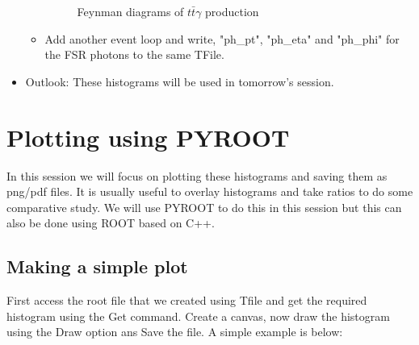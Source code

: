 \documentclass[letterpaper,12pt]{article}
\begin{document}
\begin{itemize}
\begin{itemize}
\begin{figure}[h]
  \centering
  \caption{Feynman diagrams of $t\bar{t}\gamma$ production}
  \label{fig:tty}
\end{figure}

\item Add another event loop and write, "ph\_pt", "ph\_eta" and "ph\_phi" for the FSR photons to the same TFile.   
\end{itemize}
\item Outlook: These histograms will be used in tomorrow's session.
\end{itemize}
\break
\section{Plotting using PYROOT}

In this session we will focus on plotting these histograms and saving them as png/pdf files. It is usually useful to overlay histograms and take ratios to do some comparative study. We will use PYROOT to do this in this session but this can also be done using ROOT based on C++. 

\subsection{Making a simple plot}
First access the root file that we created using Tfile and get the required histogram using the Get command. Create a canvas, now draw the histogram using the Draw option ans Save the file. A simple example is below:
\end{document}
